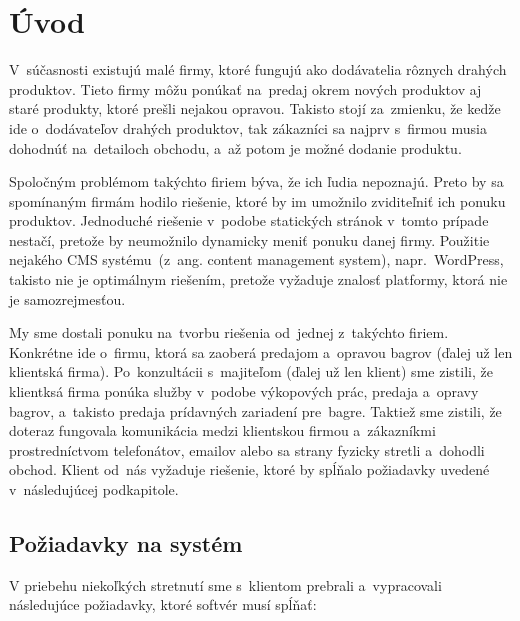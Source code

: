 \chapter{Úvod}

V~súčasnosti existujú malé firmy, ktoré fungujú ako dodávatelia rôznych drahých produktov. Tieto firmy môžu ponúkať na~predaj okrem nových produktov aj staré produkty, ktoré prešli nejakou opravou. Takisto stojí za~zmienku, že kedže ide o~dodávateľov drahých produktov, tak zákazníci sa najprv s~firmou musia dohodnúť na~detailoch obchodu, a~až potom je možné dodanie produktu.

Spoločným problémom takýchto firiem býva, že ich ľudia nepoznajú. Preto by sa spomínaným firmám hodilo riešenie, ktoré by im umožnilo zviditeľniť ich ponuku produktov. Jednoduché riešenie v~podobe statických stránok v~tomto prípade nestačí, pretože by neumožnilo dynamicky meniť ponuku danej firmy. Použitie nejakého CMS systému~(z~ang. content management system), napr.~Word\-Press, takisto nie je optimálnym riešením, pretože vyžaduje znalosť platformy, ktorá nie je samozrejmesťou.

My sme dostali ponuku na~tvorbu riešenia od~jednej z~takýchto firiem. Konkrétne ide o~firmu, ktorá sa zaoberá predajom a~opravou bagrov (ďalej už len klientská firma). Po~konzultácii s~majiteľom (ďalej už len klient) sme zistili, že klientksá firma ponúka služby v~podobe výkopových prác, predaja a~opravy bagrov, a~takisto predaja prídavných zariadení pre~bagre. Taktiež sme zistili, že doteraz fungovala komunikácia medzi klientskou firmou a~zákazníkmi prostredníctvom telefonátov, emailov alebo sa strany fyzicky stretli a~dohodli obchod. Klient od~nás vyžaduje riešenie, ktoré by spĺňalo požiadavky uvedené v~následujúcej podkapitole.

\section{Požiadavky na systém}

V priebehu niekoľkých stretnutí sme s~klientom prebrali a~vypracovali následujúce požiadavky, ktoré softvér musí spĺňať:

